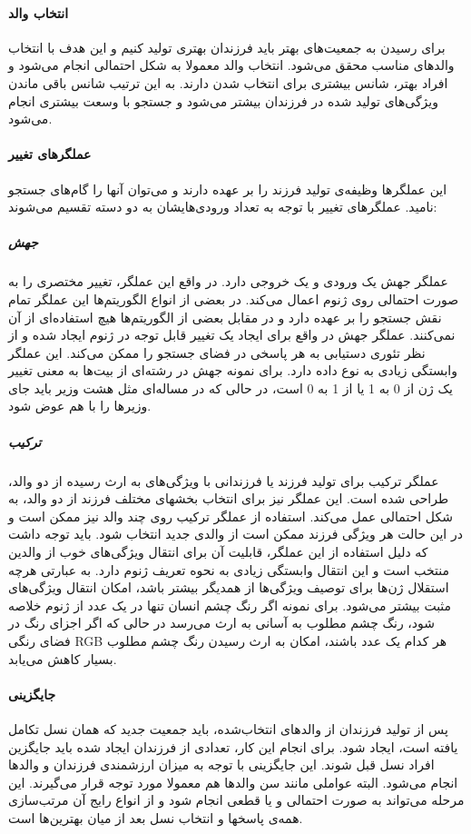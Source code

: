 \documentclass{report}
\begin{document}
\paragraph{انتخاب والد}
برای رسیدن به جمعیت‌های بهتر باید فرزندان بهتری تولید کنیم و این هدف با انتخاب والدهای مناسب محقق می‌شود. انتخاب والد معمولا به شکل احتمالی انجام می‌شود و افراد بهتر، شانس بیشتری برای انتخاب شدن دارند. به این ترتیب شانس باقی ماندن ویژگی‌های تولید شده در فرزندان بیشتر می‌شود و جستجو با وسعت بیشتری انجام می‌شود.

\paragraph{عملگرهای تغییر}
این عملگرها وظیفه‌ی تولید فرزند را بر عهده دارند و می‌توان آنها را گام‌های جستجو نامید. عملگرهای تغییر با توجه به تعداد ورودی‌هایشان به دو دسته تقسیم می‌شوند:

\subparagraph{جهش}
عملگر جهش یک ورودی و یک خروجی دارد. در واقع این عملگر، تغییر مختصری را به صورت احتمالی روی ژنوم اعمال می‌کند. در بعضی از انواع الگوریتم‌ها این عملگر تمام نقش جستجو را بر عهده دارد و در مقابل بعضی از الگوریتم‌ها هیچ استفاده‌ای از آن نمی‌کنند. عملگر جهش در واقع برای ایجاد یک تغییر قابل توجه در ژنوم ایجاد شده و از نظر تئوری دستیابی به هر پاسخی در فضای جستجو را ممکن می‌کند. این عملگر وابستگی زیادی به نوع داده دارد. برای نمونه جهش در رشته‌ای از بیت‌ها به معنی تغییر یک ژن از 0 به 1 یا از 1 به 0 است، در حالی که در مساله‌ای مثل هشت وزیر باید جای وزیرها را با هم عوض شود.

\subparagraph{ترکیب}
عملگر ترکیب برای تولید فرزند یا فرزندانی با ویژگی‌های به ارث رسیده از دو والد، طراحی شده است. این عملگر نیز برای انتخاب بخشهای مختلف فرزند از دو والد، به شکل احتمالی عمل می‌کند. استفاده از عملگر ترکیب روی چند والد نیز ممکن است و در این حالت هر ویژگی فرزند ممکن است از والدی جدید انتخاب شود. باید توجه داشت که دلیل استفاده از این عملگر، قابلیت آن برای انتقال ویژگی‌های خوب از والدین منتخب است و این انتقال وابستگی زیادی به نحوه تعریف ژنوم دارد. به عبارتی هرچه استقلال ژن‌ها برای توصیف ویژگی‌ها از همدیگر بیشتر باشد، امکان انتقال ویژگی‌های مثبت بیشتر می‌شود. برای نمونه اگر رنگ چشم انسان تنها در یک عدد از ژنوم خلاصه شود، رنگ چشم مطلوب به آسانی به ارث می‌رسد در حالی که اگر اجزای رنگ در فضای رنگی RGB هر کدام یک عدد باشند، امکان به ارث رسیدن رنگ چشم مطلوب بسیار کاهش می‌یابد.

\paragraph{جایگزینی}
پس از تولید فرزندان از والدهای انتخاب‌شده، باید جمعیت جدید که همان نسل تکامل یافته است، ایجاد شود. برای انجام این کار، تعدادی از فرزندان ایجاد شده باید جایگزین افراد نسل قبل شوند. این جایگزینی با توجه به میزان ارزشمندی فرزندان و والدها انجام می‌شود. البته عواملی مانند سن والدها هم معمولا مورد توجه قرار می‌گیرند. این مرحله می‌تواند به صورت احتمالی و یا قطعی انجام شود و از انواع رایج آن مرتب‌سازی همه‌ی پاسخها و انتخاب نسل بعد از میان بهترین‌ها است.
\end{document}
